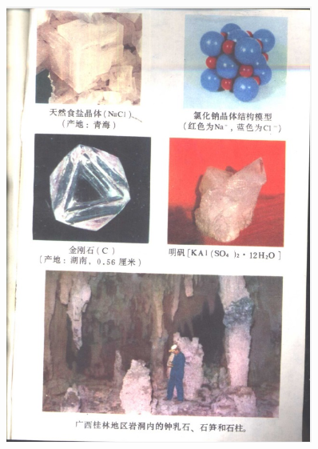 \begin{titlepage}
    \begin{figure}[htbp]
        \centering
        \includegraphics[width=0.9\textwidth]{../pic/czhx1-cover-2}
    \end{figure}

 \end{titlepage}
